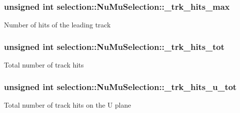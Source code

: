 \subsubsection[{\texorpdfstring{\+\_\+trk\+\_\+hits\+\_\+max}{_trk_hits_max}}]{\setlength{\rightskip}{0pt plus 5cm}unsigned int selection\+::\+Nu\+Mu\+Selection\+::\+\_\+trk\+\_\+hits\+\_\+max\hspace{0.3cm}{\ttfamily [private]}}\hypertarget{classselection_1_1NuMuSelection_a3e0166490638c0d08a3b66de9ed1ec91}{}\label{classselection_1_1NuMuSelection_a3e0166490638c0d08a3b66de9ed1ec91}
Number of hits of the leading track 
\subsubsection[{\texorpdfstring{\+\_\+trk\+\_\+hits\+\_\+tot}{_trk_hits_tot}}]{\setlength{\rightskip}{0pt plus 5cm}unsigned int selection\+::\+Nu\+Mu\+Selection\+::\+\_\+trk\+\_\+hits\+\_\+tot\hspace{0.3cm}{\ttfamily [private]}}\hypertarget{classselection_1_1NuMuSelection_abcc3673c89468d4af37e7936ac5716ea}{}\label{classselection_1_1NuMuSelection_abcc3673c89468d4af37e7936ac5716ea}
Total number of track hits 
\subsubsection[{\texorpdfstring{\+\_\+trk\+\_\+hits\+\_\+u\+\_\+tot}{_trk_hits_u_tot}}]{\setlength{\rightskip}{0pt plus 5cm}unsigned int selection\+::\+Nu\+Mu\+Selection\+::\+\_\+trk\+\_\+hits\+\_\+u\+\_\+tot\hspace{0.3cm}{\ttfamily [private]}}\hypertarget{classselection_1_1NuMuSelection_ab9a14b2e6823b5309c44d17e343087c6}{}\label{classselection_1_1NuMuSelection_ab9a14b2e6823b5309c44d17e343087c6}
Total number of track hits on the U plane 
